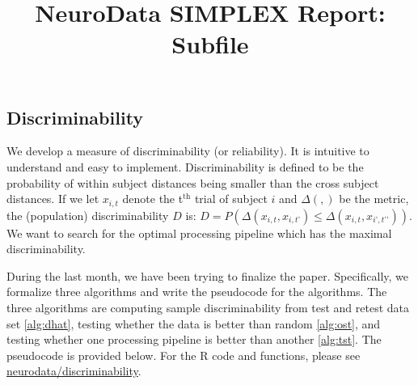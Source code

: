 \documentclass[simplex.tex]{subfiles}
\title{NeuroData SIMPLEX Report: Subfile}
\begin{document}

\subsection{Discriminability}

We develop a measure of discriminability (or reliability).  It
is intuitive to understand and easy to implement.
Discriminability is defined to be the probability of within
subject distances being smaller than the cross subject
distances. If we let $x_{i,t}$ denote the t$^{\text{th}}$ trial of subject 
$i$ and $\Delta(,)$ be the metric, the (population) discriminability $D$
is: $D= P (\Delta(x_{i,t} , x_{i,t’}) \leq  \Delta(x_{i,t} , x_{i’,t’’}))$.
We want to search for the optimal processing pipeline which has the
maximal discriminability. 

During the last month, we have been trying to finalize the paper. Specifically, we formalize three algorithms and write the pseudocode for the algorithms. The three algorithms are computing sample discriminability from test and retest data set \ref{alg:dhat}, testing whether the data is better than random \ref{alg:ost}, and testing whether one processing pipeline is better than another \ref{alg:tst}. The pseudocode is provided below. For the R code and functions, please see \href{http://github.com/neurodata/discriminability}{neurodata/discriminability}.
\end{document}
